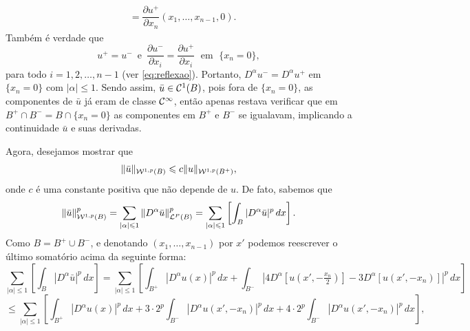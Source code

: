 \begin{prf}
\[\begin{aligned}
         &= \dfrac{\partial u^+}{\partial x_n}(x_1,\dots,x_{n-1},0).
        \end{aligned}
    \]
    Também é verdade que
    \[
        u^+ = u^- \,\text{ e }\, \dfrac{\partial u^-}{\partial x_i} = \dfrac{\partial u^+}{\partial x_i}  \;\text{ em }\; \{x_n = 0\},
    \]
    para todo $i = 1,2,\dots,n-1$ (ver \ref{eq:reflexao}). Portanto, $D^\alpha u^- = D^\alpha u^+$ em $\{x_n = 0\}$ com $|\alpha| \leqslant 1$. Sendo assim, $\bar u \in \mathcal{C}^1 (B)$, pois fora de $\{x_n = 0\}$, as componentes de $\bar u$ já eram de classe $\mathcal{C}^\infty$, então apenas restava verificar que em $B^+ \cap B^- = B \cap \{x_n = 0\}$ as componentes em $B^+$ e $B^-$ se igualavam, implicando a continuidade $\bar u$ e suas derivadas.

    Agora, desejamos mostrar que 
    \begin{equation} \label{eq:desigualdade-B-Bmais}
        \Vert \bar u \Vert_{\mathcal{W}^{1,p}(B)} \leqslant c \Vert u \Vert_{\mathcal{W}^{1,p}(B^+)},
    \end{equation}
    onde $c$ é uma constante positiva que não depende de $u$.
    De fato, sabemos que
    \[
        \Vert \bar u \Vert_{\mathcal{W}^{1,p}(B)}^p = \sum_{|\alpha| \leqslant 1} \Vert D^\alpha\bar u \Vert_{\mathcal{L}^P(B)}^p = \sum_{|\alpha| \leqslant 1} \left[\int_B |D^\alpha \bar u| ^p \,dx\right].
    \]
    Como $B = B^+ \cup B^-$, e denotando $(x_1,\dots,x_{n-1})$ por $x'$ podemos reescrever o último somatório acima da seguinte forma:
    \[
        \sum_{|\alpha| \leqslant 1} \left[\int_B |D^\alpha \bar u| ^p \,dx\right] = \sum_{|\alpha| \leqslant 1} \left[ \int_{B^+} |D^\alpha u(x)|^p \,dx + \int_{B^-} |4D^\alpha [u(x',-\tfrac{x_n}{2})] - 3D^\alpha [u(x',-x_n)] |^p \,dx \right]
    \]
    \[
        \leqslant \sum_{|\alpha| \leqslant 1} \left[ \int_{B^+} |D^\alpha u(x)|^p \,dx + 3 \cdot 2^p\int_{B^-} |D^\alpha u(x',-x_n)|^p \,dx + 4 \cdot 2^p\int_{B^-} |D^\alpha u(x',-x_n)|^p \,dx   \right], 
\]
\end{prf}
